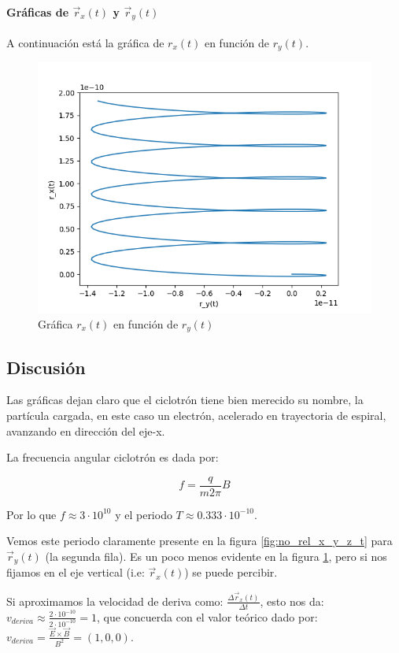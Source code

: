 \newpage 

\paragraph{Gráficas de $\vec{r}_x(t)$ y $\vec{r}_y(t)$}

A continuación está la gráfica de $r_x(t)$ en función de $r_y(t)$.

\begin{figure}[H]
	\includegraphics[width=\linewidth]{figures/no_rel_y_x.png}
	\caption{Gráfica $r_x(t)$ en función de $r_y(t)$}
	\label{fig:no_rel_y_x}
\end{figure}

\subsection{Discusión}

Las gráficas dejan claro que el ciclotrón tiene bien merecido su nombre, la partícula cargada, en este caso un electrón, acelerado en trayectoria de espiral, avanzando en dirección del eje-x.

La frecuencia angular ciclotrón es dada por:

$$
f = \frac{q}{m 2 \pi}B
$$

Por lo que $f \approx 3 \cdot 10^{10}$ y el periodo $T \approx 0.333 \cdot 10^{-10}$.

Vemos este periodo claramente presente en la figura \ref{fig:no_rel_x_y_z_t} para $\vec{r}_y(t)$ (la segunda fila). Es un poco menos evidente en la figura \ref{fig:no_rel_y_x}, pero si nos fijamos en el eje vertical (i.e: $\vec{r}_x(t)$) se puede percibir.

Si aproximamos la velocidad de deriva como: $\frac{\Delta \vec{r}_x(t)}{\Delta t}$, esto nos da: $v_{deriva} \approx \frac{2 \cdot 10^{-10}}{2 \cdot 10^{-10}} = 1$, que concuerda con el valor teórico dado por: $v_{deriva} = \frac{\vec{E} \times \vec{B}}{B^2} = (1, 0, 0)$. 
